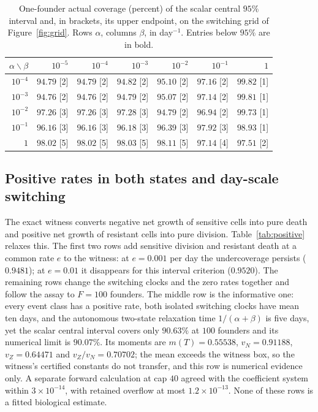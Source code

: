 \documentclass[11pt,a4paper]{article}
\theoremstyle{plain}
\theoremstyle{definition}
\theoremstyle{remark}
\begin{document}
\begin{table}[ht]
\centering\small
\caption{One-founder actual coverage (percent) of the scalar central $95\%$ interval and, in brackets, its upper endpoint, on the switching grid of Figure~\ref{fig:grid}. Rows $\alpha$, columns $\beta$, in day$^{-1}$. Entries below $95\%$ are in bold.}
\label{tab:grid}
\begin{tabular}{r|rrrrrr}
\toprule
$\alpha\backslash\beta$ & $10^{-5}$ & $10^{-4}$ & $10^{-3}$ & $10^{-2}$ & $10^{-1}$ & $1$\\
\midrule
$10^{-4}$ & $\mathbf{94.79}$ [2] & $\mathbf{94.79}$ [2] & $\mathbf{94.82}$ [2] & $95.10$ [2] & $97.16$ [2] & $99.82$ [1]\\
$10^{-3}$ & $\mathbf{94.76}$ [2] & $\mathbf{94.76}$ [2] & $\mathbf{94.79}$ [2] & $95.07$ [2] & $97.14$ [2] & $99.81$ [1]\\
$10^{-2}$ & $97.26$ [3] & $97.26$ [3] & $97.28$ [3] & $\mathbf{94.79}$ [2] & $96.94$ [2] & $99.73$ [1]\\
$10^{-1}$ & $96.16$ [3] & $96.16$ [3] & $96.18$ [3] & $96.39$ [3] & $97.92$ [3] & $98.93$ [1]\\
$1$ & $98.02$ [5] & $98.02$ [5] & $98.03$ [5] & $98.11$ [5] & $97.14$ [4] & $97.51$ [2]\\
\bottomrule
\end{tabular}
\end{table}

\subsection{Positive rates in both states and day-scale switching}\label{sec:positive}
The exact witness converts negative net growth of sensitive cells into pure death and positive net growth of resistant cells into pure division. Table~\ref{tab:positive} relaxes this. The first two rows add sensitive division and resistant death at a common rate $e$ to the witness: at $e=0.001$ per day the undercoverage persists ($0.9481$); at $e=0.01$ it disappears for this interval criterion ($0.9520$). The remaining rows change the switching clocks and the zero rates together and follow the assay to $F=100$ founders. The middle row is the informative one: every event class has a positive rate, both isolated switching clocks have mean ten days, and the autonomous two-state relaxation time $1/(\alpha+\beta)$ is five days, yet the scalar central interval covers only $90.63\%$ at $100$ founders and its numerical limit is $90.07\%$. Its moments are $m(T)=0.55538$, $v_N=0.91188$, $v_Z=0.64471$ and $v_Z/v_N=0.70702$; the mean exceeds the witness box, so the witness's certified constants do not transfer, and this row is numerical evidence only. A separate forward calculation at cap $40$ agreed with the coefficient system within $3\times10^{-14}$, with retained overflow at most $1.2\times10^{-13}$. None of these rows is a fitted biological estimate.
\end{document}
